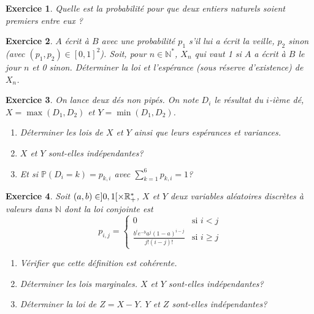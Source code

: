 \documentclass[12pt]{article}
\newtheorem{exercise}{Exercice}[section]
\theoremstyle{remark}
\theoremstyle{remark}
\newcommand{\N}{\mathbb{N}} \newcommand{\Z}{\mathbb{Z}}
\renewcommand{\P}{\mathbb{P}} \newcommand{\im}{\emph{Im}}
\begin{document}
\begin{exercise}
	Quelle est la probabilité pour que deux entiers naturels soient premiers entre
	eux ?
\end{exercise}

\begin{exercise}
	$A$ écrit à $B$ avec une probabilité $p_{1}$ s'il lui a écrit la veille,
	$p_{2}$ sinon (avec $(p_{1},p_{2})\in[0,1]^{2}$). Soit, pour $n\in\N^{*}$,
	$X_{n}$ qui vaut 1 si $A$ a écrit à $B$ le jour $n$ et 0 sinon. Déterminer la
	loi et l'espérance (sous réserve d'existence) de $X_{n}$.
\end{exercise}

\begin{exercise}
	On lance deux dés non pipés. On note $D_{i}$ le résultat du $i$-ième dé,
	$X=\max(D_{1},D_{2})$ et $Y=\min(D_{1},D_{2})$.
	\begin{enumerate}
		\item
		Déterminer les lois de $X$ et $Y$ ainsi que leurs espérances et variances.
		\item
		$X$ et $Y$ sont-elles indépendantes?
		\item
		Et si $\P(D_{i}=k)=p_{k,i}$ avec $\sum_{k=1}^{6}p_{k,i}=1$?
	\end{enumerate}
\end{exercise}

\begin{exercise}
	Soit $(a,b)\in]0,1[\times\mathbb{R}_{+}^{*}$, $X$ et $Y$ deux variables aléatoires
	discrètes à valeurs dans $\N$ dont la loi conjointe est
	$$
	p_{i,j}=
	\left\{
		\begin{array}{cc}
			0 & \text{si }i<j\\
			\frac{b^{i}e^{-b}a^{j}(1-a)^{i-j}}{j!(i-j)!} & \text{si }i\geqslant j
		\end{array}
	\right.
	$$
	\begin{enumerate}
		\item
		Vérifier que cette définition est cohérente.
		\item
		Déterminer les lois marginales. $X$ et $Y$ sont-elles indépendantes?
		\item
		Déterminer la loi de $Z=X-Y$. $Y$ et $Z$ sont-elles indépendantes?
	\end{enumerate}
\end{exercise}
\end{document}
